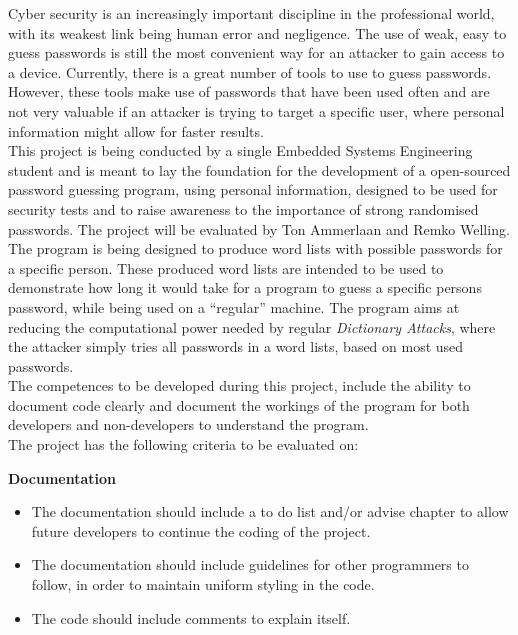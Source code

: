 \documentclass[a4paper,12pt]{article}
\begin{document}
Cyber security is an increasingly important discipline in the professional world, with its weakest link being human error and negligence. The use of weak, easy to guess passwords is still the most convenient way for an attacker to gain access to a device. Currently, there is a great number of tools to use to guess passwords. However, these tools make use of passwords that have been used often and are not very valuable if an attacker is trying to target a specific user, where personal information might allow for faster results.\\

This project is being conducted by a single Embedded Systems Engineering student and is meant to lay the foundation for the development of a open-sourced password guessing program, using personal information, designed to be used for security tests and to raise awareness to the importance of strong randomised passwords. The project will be evaluated by Ton Ammerlaan and Remko Welling.\\

The program is being designed to produce word lists with possible passwords for a specific person. These produced word lists are intended to be used to demonstrate how long it would take for a program to guess a specific persons password, while being used on a ``regular'' machine. The program aims at reducing the computational power needed by regular \textit{Dictionary Attacks}, where the attacker simply tries all passwords in a word lists, based on most used passwords.\\

The competences to be developed during this project, include the ability to document code clearly and document the workings of the program for both developers and non-developers to understand the program.\\

The project has the following criteria to be evaluated on:

\textbf{Documentation}
\begin{itemize}
\item The documentation should include a to do list and/or advise chapter to allow future developers to continue the coding of the project.
\item The documentation should include guidelines for other programmers to follow, in order to maintain uniform styling in the code.
\item The code should include comments to explain itself.
\end{itemize}
\end{document}
